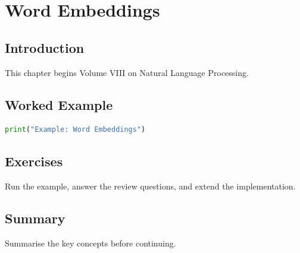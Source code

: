 \chapter{Word Embeddings}
\label{chap:vol8-3}



\section{Introduction}
This chapter begins Volume VIII on Natural Language Processing.

\section{Worked Example}
\begin{lstlisting}[language=Python]
print("Example: Word Embeddings")
\end{lstlisting}

\section{Exercises}
\begin{exercise}
Run the example, answer the review questions, and extend the implementation.
\end{exercise}

\section{Summary}
Summarise the key concepts before continuing.
